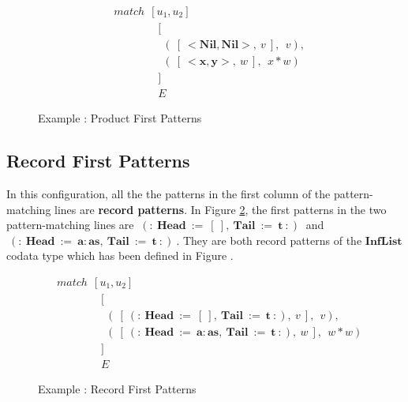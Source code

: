 \documentclass[11pt]{article}
\begin{document}
    \begin{figure}[!h]
    \begin{align*} 
    &match~~[u_1,u_2] \\
    &\qquad\qquad [\\
    &\qquad\qquad ~~(~[~\mathbf{<Nil,Nil>},~v~],~~v), \\
    &\qquad\qquad ~~(~[~\mathbf{<x,y>},~w~],~~x*w) \\
    &\qquad\qquad ]\\
    &\qquad\qquad E
    \end{align*} 
    \caption{Example : Product First Patterns} \label{fig:Pmatch_AllProds}
    \end{figure}

\subsection {Record First Patterns}
In this configuration, all the the patterns in the first column of the pattern-matching lines are {\bf record patterns}. In Figure \ref {fig:Pmatch_RecProds}, the first patterns in the two pattern-matching lines are $~\mathbf{(:~Head~:=~[~],~Tail~:=~t~:)}~$ and $~\mathbf{(:~Head~:=~a:as,~Tail~:=~t~:)}~$. They are both record patterns of the $\mathbf{InfList}$ codata type which has been defined in Figure .

    \begin{figure}[!h]
    \begin{align*} 
    &match~~[u_1,u_2] \\
    &\qquad\qquad [\\
    &\qquad\qquad ~~(~[~\mathbf{(:~Head~:=~[~],~Tail~:=~t~:)},~v~],~~v), \\
    &\qquad\qquad ~~(~[~\mathbf{(:~Head~:=~a:as,~Tail~:=~t~:)},~w~],~~w*w) \\
    &\qquad\qquad ]\\
    &\qquad\qquad E
    \end{align*} 
    \caption{Example : Record First Patterns} \label{fig:Pmatch_RecProds}
    \end{figure}
\end{document}
